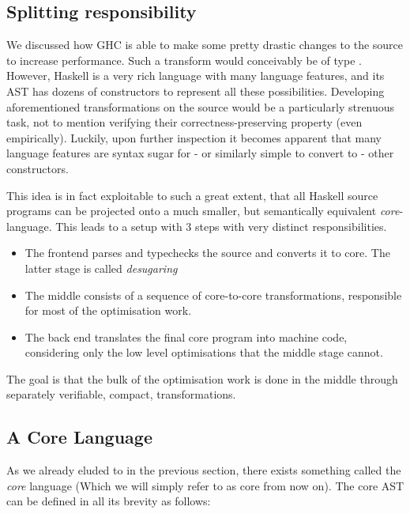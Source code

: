 \subsection{Splitting responsibility}

We discussed how GHC is able to make some pretty drastic changes to the source to increase performance.
Such a transform would conceivably be of type  . However, Haskell is a very rich language
with many language features, and its AST has dozens of constructors to represent all these possibilities.
Developing aforementioned transformations on the source would be a particularly strenuous task, not to mention verifying 
their correctness-preserving property (even empirically). Luckily, upon further inspection it becomes apparent that many
language features are syntax sugar for - or similarly simple to convert to - other constructors.

This idea is in fact exploitable to such a great extent, that all Haskell source programs can be projected onto a much
smaller, but semantically equivalent \textit{core}-language. This leads to a setup with 3 steps with very distinct responsibilities.

\begin{itemize}
  \item The frontend parses and typechecks the source and converts it to core. The latter stage is called \textit{desugaring}
  \item The middle consists of a sequence of core-to-core transformations, responsible for most of the optimisation work.
  \item The back end translates the final core program into machine code, considering only the low level optimisations that the middle stage cannot.
\end{itemize}

The goal is that the bulk of the optimisation work is done in the middle through separately verifiable, compact, transformations. \cite{haskell_optimisations_1997}

\subsection{A Core Language}

As we already eluded to in the previous section, there exists something called the \textit{core} language (Which we will simply refer to as core from now on).
The core AST can be defined in all its brevity as follows:

